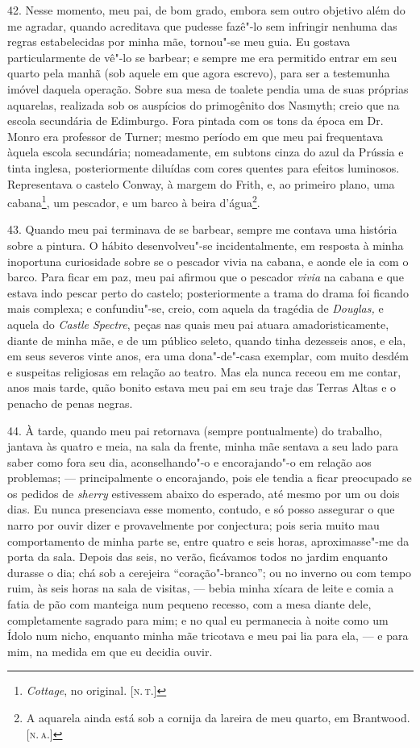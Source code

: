 42. Nesse momento, meu pai, de bom grado, embora sem outro objetivo além
do me agradar, quando acreditava que pudesse fazê"-lo sem infringir
nenhuma das regras estabelecidas por minha mãe, tornou"-se meu guia. Eu
gostava particularmente de vê"-lo se barbear; e sempre me era permitido
entrar em seu quarto pela manhã (sob aquele em que agora escrevo), para
ser a testemunha imóvel daquela operação. Sobre sua mesa de toalete
pendia uma de suas próprias aquarelas, realizada sob os auspícios do
primogênito dos Nasmyth; creio que na escola secundária de Edimburgo.
Fora pintada com os tons da época em Dr. Monro era professor de Turner;
mesmo período em que meu pai frequentava àquela escola secundária;
nomeadamente, em subtons cinza do azul da Prússia e tinta inglesa,
posteriormente diluídas com cores quentes para efeitos luminosos.
Representava o castelo Conway, à margem do Frith, e, ao primeiro plano,
uma cabana\footnote{\emph{Cottage}, no original. {[}\textsc{n.\,t.}{]}}, um
pescador, e um barco à beira d'água\footnote{A aquarela ainda está sob a
  cornija da lareira de meu quarto, em Brantwood. {[}\textsc{n.\,a.}{]}}.

43. Quando meu pai terminava de se barbear, sempre me contava uma
história sobre a pintura. O hábito desenvolveu"-se incidentalmente, em
resposta à minha inoportuna curiosidade sobre se o pescador vivia na
cabana, e aonde ele ia com o barco. Para ficar em paz, meu pai afirmou
que o pescador \emph{vivia} na cabana e que estava indo pescar perto do
castelo; posteriormente a trama do drama foi ficando mais complexa; e
confundiu"-se, creio, com aquela da tragédia de \emph{Douglas,} e aquela
do \emph{Castle Spectre}, peças nas quais meu pai atuara
amadoristicamente, diante de minha mãe, e de um público seleto, quando
tinha dezesseis anos, e ela, em seus severos vinte anos, era uma
dona"-de"-casa exemplar, com muito desdém e suspeitas religiosas em
relação ao teatro. Mas ela nunca receou em me contar, anos mais tarde,
quão bonito estava meu pai em seu traje das Terras Altas e o penacho de
penas negras.

44. À tarde, quando meu pai retornava (sempre pontualmente) do trabalho,
jantava às quatro e meia, na sala da frente, minha mãe sentava a seu
lado para saber como fora seu dia, aconselhando"-o e encorajando"-o em
relação aos problemas; --- principalmente o encorajando, pois ele tendia
a ficar preocupado se os pedidos de \emph{sherry} estivessem abaixo do
esperado, até mesmo por um ou dois dias. Eu nunca presenciava esse
momento, contudo, e só posso assegurar o que narro por ouvir dizer e
provavelmente por conjectura; pois seria muito mau comportamento de
minha parte se, entre quatro e seis horas, aproximasse"-me da porta da
sala. Depois das seis, no verão, ficávamos todos no jardim enquanto
durasse o dia; chá sob a cerejeira ``coração"-branco''; ou no inverno ou
com tempo ruim, às seis horas na sala de visitas, --- bebia minha xícara
de leite e comia a fatia de pão com manteiga num pequeno recesso, com a
mesa diante dele, completamente sagrado para mim; e no qual eu
permanecia à noite como um Ídolo num nicho, enquanto minha mãe tricotava
e meu pai lia para ela, --- e para mim, na medida em que eu decidia
ouvir.

